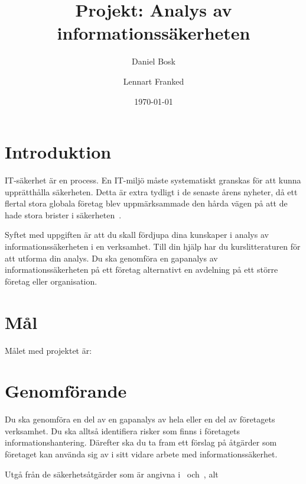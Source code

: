\documentclass[a4paper]{article}
\begin{document}
\title{Projekt: Analys av informationssäkerheten}
\author{Daniel Bosk}
\author{Lennart Franked}
\date{\today}

\maketitle

\section{Introduktion}

IT-säkerhet är en process.
En IT-miljö måste systematiskt granskas för att kunna upprätthålla säkerheten.
Detta är extra tydligt i de senaste årens nyheter, då ett flertal stora globala 
företag blev uppmärksammade den hårda vägen på att de hade stora brister 
i säkerheten~\cite[se][]{Fisher2011rsa,Hunt2011abs,Cluley2012twp,%
  Oberheide2010bao,Cubrilovic2009rhf,%
  Jones2013targethack,Ducklin2014targethack,Zetter2014targethack%
}.

Syftet med uppgiften är att du skall fördjupa dina kunskaper i analys av 
informationssäkerheten i en verksamhet.
Till din hjälp har du kurslitteraturen för att utforma din analys.
Du ska genomföra en gapanalys av informationssäkerheten på ett företag 
alternativt en avdelning på ett större företag eller organisation.


\section{Mål}

Målet med projektet är:
\begin{itemize}
	
\end{itemize}


\section{Genomförande}
\noindent
Du ska genomföra en del av en gapanalys av hela eller en del av företagets 
verksamhet.
Du ska alltså identifiera risker som finns i företagets informationshantering.
Därefter ska du ta fram ett förslag på åtgärder som företaget kan använda sig 
av i sitt vidare arbete med informationssäkerhet.

Utgå från de säkerhetsåtgärder som är angivna i~\cite[Bilaga A]{iso27001} 
och~\cite[Bilaga A]{iso27701}, alt~\cite[VERKTYG-ANALYS-GAP.XLSX]{MSB2018anv} 
\end{document}
